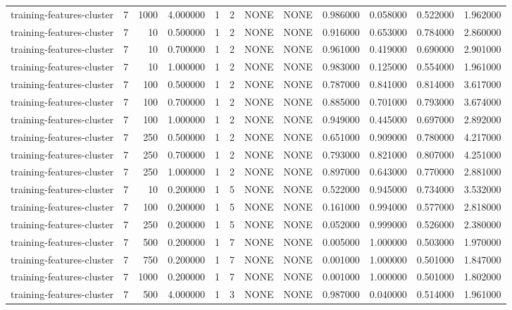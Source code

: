 \begin{tabular}{lrrrllllrrrr}
training-features-cluster & 7 & 1000 & 4.000000 & 1 & 2 & NONE & NONE & 0.986000 & 0.058000 & 0.522000 & 1.962000 \\
training-features-cluster & 7 & 10 & 0.500000 & 1 & 2 & NONE & NONE & 0.916000 & 0.653000 & 0.784000 & 2.860000 \\
training-features-cluster & 7 & 10 & 0.700000 & 1 & 2 & NONE & NONE & 0.961000 & 0.419000 & 0.690000 & 2.901000 \\
training-features-cluster & 7 & 10 & 1.000000 & 1 & 2 & NONE & NONE & 0.983000 & 0.125000 & 0.554000 & 1.961000 \\
training-features-cluster & 7 & 100 & 0.500000 & 1 & 2 & NONE & NONE & 0.787000 & 0.841000 & 0.814000 & 3.617000 \\
training-features-cluster & 7 & 100 & 0.700000 & 1 & 2 & NONE & NONE & 0.885000 & 0.701000 & 0.793000 & 3.674000 \\
training-features-cluster & 7 & 100 & 1.000000 & 1 & 2 & NONE & NONE & 0.949000 & 0.445000 & 0.697000 & 2.892000 \\
training-features-cluster & 7 & 250 & 0.500000 & 1 & 2 & NONE & NONE & 0.651000 & 0.909000 & 0.780000 & 4.217000 \\
training-features-cluster & 7 & 250 & 0.700000 & 1 & 2 & NONE & NONE & 0.793000 & 0.821000 & 0.807000 & 4.251000 \\
training-features-cluster & 7 & 250 & 1.000000 & 1 & 2 & NONE & NONE & 0.897000 & 0.643000 & 0.770000 & 2.881000 \\
training-features-cluster & 7 & 10 & 0.200000 & 1 & 5 & NONE & NONE & 0.522000 & 0.945000 & 0.734000 & 3.532000 \\
training-features-cluster & 7 & 100 & 0.200000 & 1 & 5 & NONE & NONE & 0.161000 & 0.994000 & 0.577000 & 2.818000 \\
training-features-cluster & 7 & 250 & 0.200000 & 1 & 5 & NONE & NONE & 0.052000 & 0.999000 & 0.526000 & 2.380000 \\
training-features-cluster & 7 & 500 & 0.200000 & 1 & 7 & NONE & NONE & 0.005000 & 1.000000 & 0.503000 & 1.970000 \\
training-features-cluster & 7 & 750 & 0.200000 & 1 & 7 & NONE & NONE & 0.001000 & 1.000000 & 0.501000 & 1.847000 \\
training-features-cluster & 7 & 1000 & 0.200000 & 1 & 7 & NONE & NONE & 0.001000 & 1.000000 & 0.501000 & 1.802000 \\
training-features-cluster & 7 & 500 & 4.000000 & 1 & 3 & NONE & NONE & 0.987000 & 0.040000 & 0.514000 & 1.961000 \\

\end{tabular}
